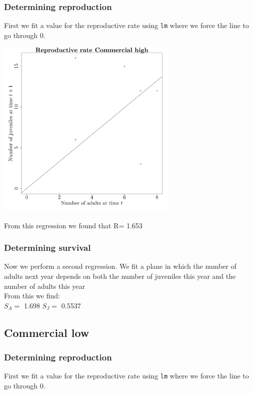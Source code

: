 \documentclass{article}\usepackage[]{graphicx}\usepackage[]{color}
\begin{document}
\subsubsection{Determining reproduction}

First we fit a value for the reproductive rate using \texttt{lm} where we force the line to go through $0$. 



{\centering \includegraphics[width=0.65\textwidth]{figure/k51} 

}



 From this regression we found that R= 1.653 

\subsubsection{Determining survival}

Now we perform a second regression. We fit a plane in which the number of adults next year depends on both the number of juveniles this year and the number of adults this year\\From this we find:\\ 
$S_A=$ 1.698 
$S_J=$ 0.5537 
\subsection{ Commercial low }
\subsubsection{Determining reproduction}

First we fit a value for the reproductive rate using \texttt{lm} where we force the line to go through $0$. 
\end{document}
